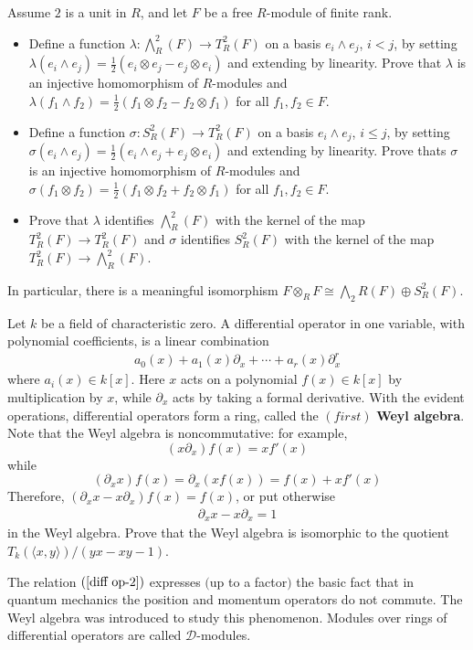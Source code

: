 \begin{exercise}
Assume $2$ is a unit in $R$, and let $F$ be a free $R$-module of finite rank.
\begin{itemize}
\item Define a function $\lambda:\bigwedge^2_R(F)\to T^2_R(F)$ on a basis $e_i\wedge e_j$, $i<j$, by setting $\lambda(e_i\wedge e_j)=\frac{1}{2}(e_i\otimes e_j-e_j\otimes e_i)$ and extending by linearity. Prove that $\lambda$ is an injective homomorphism of $R$-modules and $\lambda(f_1\wedge f_2)=\frac{1}{2}(f_1\otimes f_2-f_2\otimes f_1)$ for all $f_1,f_2\in F$.
\item Define a function $\sigma:S^2_R(F)\to T^2_R(F)$ on a basis $e_i\wedge e_j$, $i\leqslant j$, by setting $\sigma(e_i\wedge e_j)=\frac{1}{2}(e_i\wedge e_j+e_j\otimes e_i)$ and extending by linearity. Prove thats $\sigma$ is an injective homomorphism of $R$-modules and $\sigma(f_1\otimes f_2)=\frac{1}{2}(f_1\otimes f_2+f_2\otimes f_1)$ for all $f_1,f_2\in F$.
\item Prove that $\lambda$ identifies $\bigwedge^2_R(F)$ with the kernel of the map $T^2_R(F)\to T^2_R(F)$ and $\sigma$ identifies $S^2_R(F)$ with the kernel of the map $T^2_R(F)\to\bigwedge^2_R(F)$.
\end{itemize}
In particular, there is a meaningful isomorphism $F\otimes_{R}F\cong\bigwedge_2R(F)\oplus S^2_R(F)$.
\end{exercise}
\begin{exercise}
Let $k$ be a field of characteristic zero. A differential operator in one variable, with polynomial coefficients, is a linear combination
\begin{align}\label{diff op-1}
a_0(x)+a_1(x)\partial_x+\cdots+a_r(x)\partial^r_x
\end{align}
where $a_i(x)\in k[x]$. Here $x$ acts on a polynomial $f(x)\in k[x]$ by multiplication by $x$, while $\partial_x$ acts by taking a formal derivative. With the evident operations, differential operators form a ring, called the $(first)$ \textbf{Weyl algebra}. Note that the Weyl algebra is noncommutative: for example,
\[(x\partial_x)f(x)=xf'(x)\]
while
\[(\partial_xx)f(x)=\partial_x(xf(x))=f(x)+xf'(x)\]
Therefore, $(\partial_xx-x\partial_x)f(x)=f(x)$, or put otherwise
\begin{align}\label{diff op-2}
\partial_xx-x\partial_x=1
\end{align}
in the Weyl algebra. Prove that the Weyl algebra is isomorphic to the quotient $T_k(\langle x, y\rangle)/(yx-xy-1)$.\par
The relation $(\ref{diff op-2})$ expresses $($up to a factor$)$ the basic fact that in quantum
mechanics the position and momentum operators do not commute. The Weyl algebra was introduced to study this phenomenon. Modules over rings of differential operators are called $\mathcal{D}$-modules.
\end{exercise}
